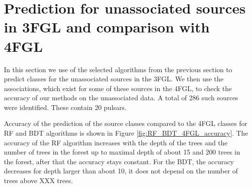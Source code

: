 \section{Prediction for unassociated sources in 3FGL and comparison with 4FGL}


In this section we use of the selected algorithms from the previous section to predict classes for the unassociated sources in the 3FGL. 
We then use the associations, which exist for some of these sources in the 4FGL, to check the accuracy of our methods on the unassociated data.  A total of 286 such sources were identified. These contain 20 pulsars.

Accuracy of the prediction of the source classes compared to the 4FGL classes for RF and BDT algorithms is shown in Figure \ref{fig:RF_BDT_4FGL_accuracy}.
The accuracy of the RF algorithm increases with the depth of the trees and the number of trees in the forest
up to maximal depth of about 15 and 200 trees in the forest, after that the accuracy stays constant.
For the BDT, the accuracy decreases for depth larger than about 10, it does not depend on the number of trees above XXX trees.


